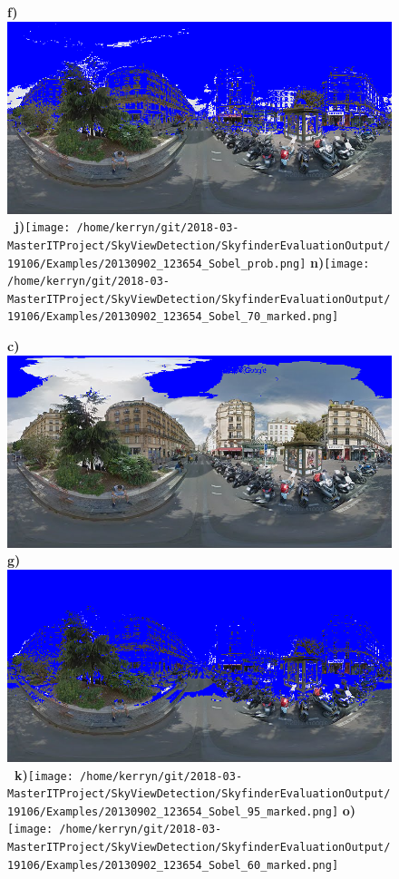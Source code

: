 \documentclass{article}
\begin{document}
\begin{figure}
\textbf{\scriptsize{f)}}\includegraphics[scale=0.13]{Images/2/panorama-JtVHmEl7WCiz1xJ0bcJpBg-1_Sobel_70_marked.png}%
\textbf{\scriptsize{~j)}}\texttt{[image: /home/kerryn/git/2018-03-MasterITProject/SkyViewDetection/SkyfinderEvaluationOutput/19106/Examples/20130902\_123654\_Sobel\_prob.png]} %
\textbf{\scriptsize{n)}}\texttt{[image: /home/kerryn/git/2018-03-MasterITProject/SkyViewDetection/SkyfinderEvaluationOutput/19106/Examples/20130902\_123654\_Sobel\_70\_marked.png]} 

\textbf{\scriptsize{c)}}\includegraphics[scale=0.13]{Images/2/panorama-JtVHmEl7WCiz1xJ0bcJpBg-1_Sobel_95_marked.png} %
\textbf{\scriptsize{g)}}\includegraphics[scale=0.13]{Images/2/panorama-JtVHmEl7WCiz1xJ0bcJpBg-1_Sobel_60_marked.png}%
\textbf{\scriptsize{~k)}}\texttt{[image: /home/kerryn/git/2018-03-MasterITProject/SkyViewDetection/SkyfinderEvaluationOutput/19106/Examples/20130902\_123654\_Sobel\_95\_marked.png]} %
\textbf{\scriptsize{o)}}\texttt{[image: /home/kerryn/git/2018-03-MasterITProject/SkyViewDetection/SkyfinderEvaluationOutput/19106/Examples/20130902\_123654\_Sobel\_60\_marked.png]} 


\end{figure}
\end{document}
